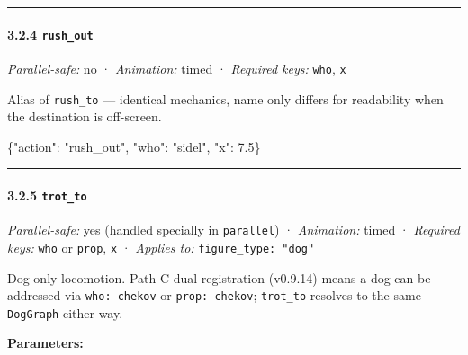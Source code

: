 \documentclass[
  11pt,
]{book}
\newenvironment{Shaded}{}{}
\newcommand{\DataTypeTok}[1]{\textcolor[rgb]{0.56,0.13,0.00}{#1}}
\newcommand{\FloatTok}[1]{\textcolor[rgb]{0.25,0.63,0.44}{#1}}
\newcommand{\FunctionTok}[1]{\textcolor[rgb]{0.02,0.16,0.49}{#1}}
\newcommand{\StringTok}[1]{\textcolor[rgb]{0.25,0.44,0.63}{#1}}
\begin{document}
\begin{center}\rule{0.5\linewidth}{0.5pt}\end{center}

\paragraph{\texorpdfstring{3.2.4
\texttt{rush\_out}}{3.2.4 rush\_out}}\label{rush_out}

\emph{Parallel-safe:} no · \emph{Animation:} timed · \emph{Required
keys:} \texttt{who}, \texttt{x}

Alias of \texttt{rush\_to} --- identical mechanics, name only differs
for readability when the destination is off-screen.

\begin{Shaded}
\begin{Highlighting}[]
\FunctionTok{\{}\DataTypeTok{"action"}\FunctionTok{:} \StringTok{"rush\_out"}\FunctionTok{,} \DataTypeTok{"who"}\FunctionTok{:} \StringTok{"sidel"}\FunctionTok{,} \DataTypeTok{"x"}\FunctionTok{:} \FloatTok{7.5}\FunctionTok{\}}
\end{Highlighting}
\end{Shaded}

\begin{center}\rule{0.5\linewidth}{0.5pt}\end{center}

\paragraph{\texorpdfstring{3.2.5
\texttt{trot\_to}}{3.2.5 trot\_to}}\label{trot_to}

\emph{Parallel-safe:} yes (handled specially in \texttt{parallel}) ·
\emph{Animation:} timed · \emph{Required keys:} \texttt{who} or
\texttt{prop}, \texttt{x} · \emph{Applies to:}
\texttt{figure\_type:\ "dog"}

Dog-only locomotion. Path C dual-registration (v0.9.14) means a dog can
be addressed via \texttt{who:\ chekov} or \texttt{prop:\ chekov};
\texttt{trot\_to} resolves to the same \texttt{DogGraph} either way.

\textbf{Parameters:}
\end{document}
